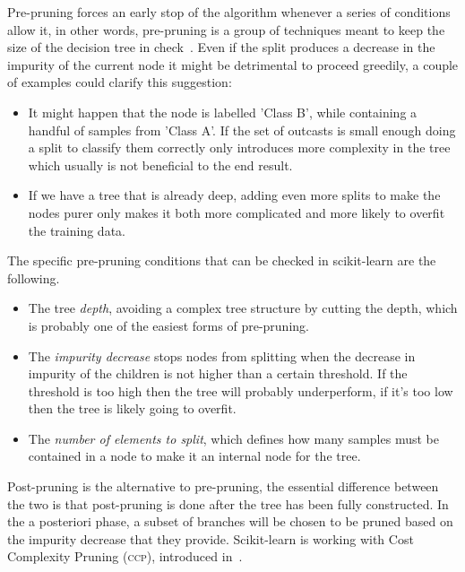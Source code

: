 \smallskip

Pre-pruning forces an early stop of the algorithm whenever a series of conditions allow it, in other
words, pre-pruning is a group of techniques meant to keep the size of the decision tree in
check~\cite{ZhouZhi-Hua2021ML, bramer2007principles, fisher1996learning}. Even if the split produces a decrease in the impurity of the current node it might be detrimental to proceed greedily, a couple of examples could clarify this suggestion:
\begin{itemize}
	\item It might happen that the node is labelled 'Class B', while containing a handful of
		samples from 'Class A'. If the set of outcasts is small enough doing a split to
		classify them correctly only introduces more complexity in the tree which usually is
		not beneficial to the end result.

	\item If we have a tree that is already deep, adding even more splits to make the nodes purer
		only makes it both more complicated and more likely to overfit the training data.
\end{itemize}

The specific pre-pruning conditions that can be checked in scikit-learn are the following.
\begin{itemize}
	\item The tree \emph{depth}, avoiding a complex tree structure by cutting the depth, which is
	      probably one of the easiest forms of pre-pruning.
	\item The \emph{impurity decrease} stops nodes from splitting when the decrease in impurity
	      of the children is not higher than a certain threshold. If the threshold is too high
	      then the tree will probably underperform, if it's too low then the tree is likely going to
	      overfit.
	\item The \emph{number of elements to split}, which defines how many samples must be
		contained in a node to make it an internal node for the tree.
\end{itemize}

Post-pruning is the alternative to pre-pruning, the essential difference between the two is that
post-pruning is done after the tree has been fully constructed. In the a posteriori phase,
a subset of branches will be chosen to be pruned based on the impurity decrease that they provide.
Scikit-learn is working with Cost Complexity Pruning (\textsc{ccp}), introduced in~\cite{breiman1984classification}.


